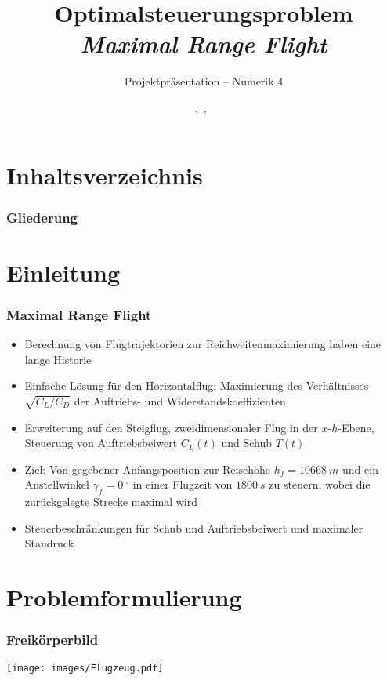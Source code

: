 \documentclass[aspectratio=169]{beamer}
\title{\textbf{Optimalsteuerungsproblem  \\ \textit{Maximal Range Flight}}}
\subtitle{Projektpräsentation -- Numerik 4}
\author{\Heiko,\ \Philipp,\ \Felix}
\institute{\institut, \fakultaet\\}
\begin{document}
\hspace*{-0.6cm}
\setcounter{framenumber}{-1}
\frame[plain]{\titlepage}



\section{Inhaltsverzeichnis}
\begin{frame}
  \frametitle{Gliederung}
  \tableofcontents
\end{frame}


\section{Einleitung}
\begin{frame}
  \frametitle{Maximal Range Flight}
  \vspace{1em}
  \begin{itemize}
    \item Berechnung von Flugtrajektorien zur Reichweitenmaximierung haben eine lange Historie
    \item Einfache Lösung für den Horizontalflug: Maximierung des Verhältnisses $\sqrt{C_{L}/C_{D}}$ der Auftriebs- und Widerstandskoeffizienten
    \item Erweiterung auf den Steigflug, zweidimensionaler Flug in der $x$-$h$-Ebene, Steuerung von Auftriebsbeiwert $C_L(t)$ und Schub $T(t)$ 
    \item  Ziel: Von gegebener Anfangsposition zur Reisehöhe $h_f = 10668\ m$ und ein Anstellwinkel $\gamma_f = 0\ ^{\circ}$ in einer Flugzeit von $1800 \ s$ zu steuern, wobei die zurückgelegte Strecke maximal wird
    \item Steuerbeschränkungen für Schub und Auftriebsbeiwert und maximaler Staudruck
  \end{itemize}
\end{frame}

\section{Problemformulierung}
\begin{frame}
  \frametitle{Freikörperbild}
  \vspace{1em}
   \begin{center}
  	\texttt{[image: images/Flugzeug.pdf]}
   \end{center}
\end{frame}
\end{document}
